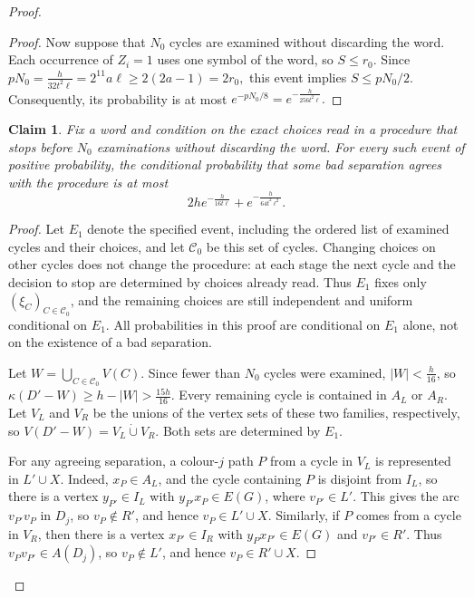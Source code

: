 \documentclass[11pt,a4paper]{article}
\newtheorem{claim}{Claim}
\theoremstyle{remark}
\numberwithin{equation}{section}
\newcommand{\calC}{\mathcal{C}}
\begin{document}
\begin{proof}
\begin{proof}
			Now suppose that $N_0$ cycles are examined without
			discarding the word.
			Each occurrence of $Z_i=1$ uses one symbol of the word,
			so $S\le r_0$.
			Since
			$
			pN_0=\frac{h}{32t^2\ell}
			=2^{11}a\ell\ge2(2a-1)=2r_0,
			$
			this event implies $S\le pN_0/2$.
			Consequently, its probability is at most
			$
			e^{-pN_0/8}=e^{-\frac{h}{256t^2\ell}}.
			$
		\end{proof}
	
		\begin{claim}\label{cl:stopped}
			Fix a word and condition on the exact choices read in a procedure that stops
			before $N_0$ examinations without discarding the word.
			For every such event of positive probability, the conditional probability that
			some bad separation agrees with the procedure is at most
			\[
				2h e^{-\frac{h}{16t\ell}}+e^{-\frac{h}{64t^2\ell^2}}.
			\]
		\end{claim}
		\begin{proof}
			Let $E_1$ denote the specified event, including the ordered list of
			examined cycles and their choices, and let $\calC_0$ be this set of cycles.
			Changing choices on other cycles does not change the procedure: at each stage
			the next cycle and the decision to stop are determined by choices already read.
			Thus $E_1$ fixes only $(\xi_C)_{C\in\calC_0}$, and the remaining choices
			are still independent and uniform conditional on $E_1$.
			All probabilities in this proof are conditional on $E_1$ alone, not on the
			existence of a bad separation.
			
			Let $W=\bigcup_{C\in\calC_0}V(C)$.
			Since fewer than $N_0$ cycles were examined, $|W|<\frac{h}{16}$, so
			$\kappa(D'-W)\ge h-|W|>\frac{15h}{16}$.
			Every remaining cycle is contained in $A_L$ or $A_R$.
			Let $V_L$ and $V_R$ be the unions of the vertex sets of these two families,
			respectively, so $V(D'-W)=V_L\mathbin{\dot\cup}V_R$.
			Both sets are determined by $E_1$.
			
			For any agreeing separation, a colour-$j$ path $P$ from a cycle in $V_L$ is represented in $L'\cup X$. Indeed, $x_P\in A_L$, and the cycle containing $P$ is disjoint from $I_L$, so there is a vertex $y_{P'}\in I_L$ with $y_{P'}x_P\in E(G)$, where $v_{P'}\in L'$. This gives the arc $v_{P'}v_P$ in $D_j$, so $v_P\notin R'$, and hence $v_P\in L'\cup X$. Similarly, if $P$ comes from a cycle in $V_R$, then there is a vertex $x_{P'}\in I_R$ with $y_Px_{P'}\in E(G)$ and $v_{P'}\in R'$. Thus $v_Pv_{P'}\in A(D_j)$, so $v_P\notin L'$, and hence $v_P\in R'\cup X$.
			

\end{proof}
\end{proof}
\end{document}
